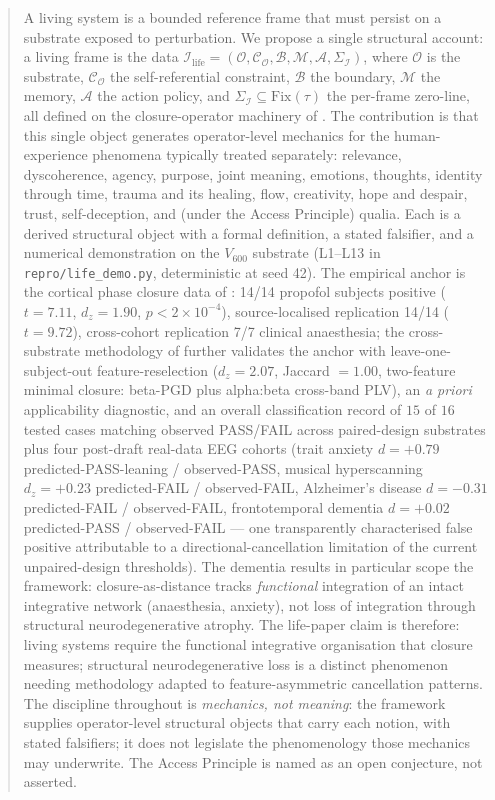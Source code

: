 \documentclass[11pt]{article}
\theoremstyle{plain}
\theoremstyle{definition}
\theoremstyle{remark}
\newcommand{\Fix}{\mathrm{Fix}}
\newcommand{\Ical}{\mathcal{I}}
\newcommand{\Ocal}{\mathcal{O}}
\newcommand{\Ccal}{\mathcal{C}}
\newcommand{\Mcal}{\mathcal{M}}
\newcommand{\Acal}{\mathcal{A}}
\newcommand{\Bcal}{\mathcal{B}}
\newcommand{\Ilife}{\Ical_{\mathrm{life}}}
\begin{document}
\begin{abstract}
A living system is a bounded reference frame that must persist on a substrate exposed to perturbation. We propose a single structural account: a living frame is the data $\Ilife = (\Ocal, \Ccal_\Ocal, \Bcal, \Mcal, \Acal, \Sigma_\Ical)$, where $\Ocal$ is the substrate, $\Ccal_\Ocal$ the self-referential constraint, $\Bcal$ the boundary, $\Mcal$ the memory, $\Acal$ the action policy, and $\Sigma_\Ical \subseteq \Fix(\tau)$ the per-frame zero-line, all defined on the closure-operator machinery of \citet{SmartExistenceClosure}. The contribution is that this single object generates operator-level mechanics for the human-experience phenomena typically treated separately: relevance, dyscoherence, agency, purpose, joint meaning, emotions, thoughts, identity through time, trauma and its healing, flow, creativity, hope and despair, trust, self-deception, and (under the Access Principle) qualia. Each is a derived structural object with a formal definition, a stated falsifier, and a numerical demonstration on the $V_{600}$ substrate (L1--L13 in \texttt{repro/life\_demo.py}, deterministic at seed 42). The empirical anchor is the cortical phase closure data of \citet{SolutionLab002}: 14/14 propofol subjects positive ($t = 7.11$, $d_z = 1.90$, $p < 2 \times 10^{-4}$), source-localised replication 14/14 ($t = 9.72$), cross-cohort replication 7/7 clinical anaesthesia; the cross-substrate methodology of \citet{SmartClosureDistance} further validates the anchor with leave-one-subject-out feature-reselection ($d_z = 2.07$, Jaccard $= 1.00$, two-feature minimal closure: beta-PGD plus alpha:beta cross-band PLV), an \emph{a priori} applicability diagnostic, and an overall classification record of $15$ of $16$ tested cases matching observed PASS/FAIL across paired-design substrates plus four post-draft real-data EEG cohorts (trait anxiety $d = +0.79$ predicted-PASS-leaning / observed-PASS, musical hyperscanning $d_z = +0.23$ predicted-FAIL / observed-FAIL, Alzheimer's disease $d = -0.31$ predicted-FAIL / observed-FAIL, frontotemporal dementia $d = +0.02$ predicted-PASS / observed-FAIL --- one transparently characterised false positive attributable to a directional-cancellation limitation of the current unpaired-design thresholds). The dementia results in particular scope the framework: closure-as-distance tracks \emph{functional} integration of an intact integrative network (anaesthesia, anxiety), not loss of integration through structural neurodegenerative atrophy. The life-paper claim is therefore: living systems require the functional integrative organisation that closure measures; structural neurodegenerative loss is a distinct phenomenon needing methodology adapted to feature-asymmetric cancellation patterns. The discipline throughout is \emph{mechanics, not meaning}: the framework supplies operator-level structural objects that carry each notion, with stated falsifiers; it does not legislate the phenomenology those mechanics may underwrite. The Access Principle is named as an open conjecture, not asserted.
\end{abstract}
\end{document}
